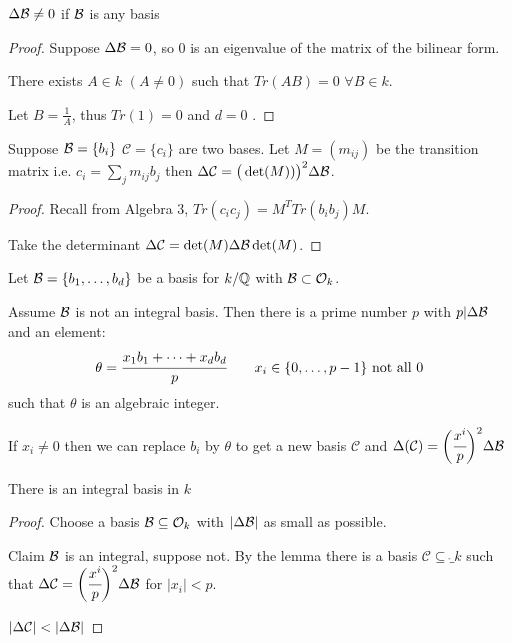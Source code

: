 \documentclass[11pt]{article}
\begin{document}
\begin{cor}
$\Delta \mathcal{B} \neq 0$ if $\mathcal{B}$ is any basis 
\end{cor}

\begin{proof}
	Suppose $\Delta \mathcal{B} = 0 $, so $0$ is an eigenvalue of the matrix of the bilinear form.

	There exists $A \in k $ \hspace{7pt} $ (A\neq 0)$ such that $Tr(AB) = 0 $\hspace{7pt} $\forall B \in k$.

	Let $B = \frac{1}{A}$, thus $Tr(1) = 0$ and $d=0$ \lightning.
\end{proof}

\begin{cor}
	Suppose $\mathcal{B} = \{b_i\}$ $\mathcal{C} = \{c_i\}$ are two bases.
	Let $M = (m_{ij})$ be the transition matrix i.e. $c_i = \sum_j m_{ij} b_j$ then $\Delta \mathcal{C}  = \big(\det(M))\big)^2 \Delta\mathcal{B}$.
\end{cor}

\begin{proof}
	Recall from Algebra 3,  $Tr(c_i c_j) = M^T Tr(b_ib_j)M$.
	\spa

	Take the determinant $\Delta \mathcal{C} = \det(M) \Delta \mathcal{B} \det(M) $.

\end{proof}
\begin{lemma}
	Let $\mathcal{B} = \{b_1, \dots, b_d \}$ be a basis for $k/ \mathbb{Q}$ with $\mathcal{B} \subset \mathcal{O}_k$.
	
	Assume $\mathcal{B}$ is not an integral basis. Then there is a prime number $p$ with $p | \Delta \mathcal{B}$ and an element:
	\begin{align*}
		\theta = \cfrac{x_1b_1 + \dots + x_db_d }{p} &&&& x_i \in \{0,\dots,p-1\} \text{ not all 0}
	\end{align*}
	such that $\theta$ is an algebraic integer.
\end{lemma}
\spa
If $x_i \neq 0$ then we can replace $b_i$ by $\theta$ to get a new basis $\mathcal{C}$ and $\Delta(\mathcal{C}) = \bigg(\cfrac{x^i}{p}\bigg)^2 \Delta \mathcal{B}$ 

\begin{theorem}
	There is an integral basis in $k$
\end{theorem}
\begin{proof}
 Choose a basis $\mathcal{B} \subseteq \mathcal{O}_k$ with $|\Delta \mathcal{B}|$ as small as possible.
\spa

	Claim $\mathcal{B}$ is an integral, suppose not.
	By the lemma there is a basis $\mathcal{C} \subseteq \ring_k$ such that $\Delta \mathcal{C} =  \bigg(\cfrac{x^i}{p}\bigg)^2 \Delta \mathcal{B}$  for $|x_i|<p$.
\spac

	$| \Delta \mathcal{C} | < |\Delta \mathcal{B}|$ \lightning


\end{proof}
\end{document}

